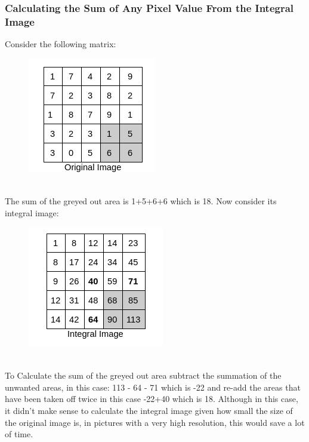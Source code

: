 \documentclass[12pt, letterpaper]{article}
\begin{document}
            \subsubsection{Calculating the Sum of Any Pixel Value From the Integral Image}
            Consider the following matrix:
            \begin{figure}[h]
                \includegraphics[scale=0.5]{photo1.png}
                \centering
            \end{figure}
            \\ The sum of the greyed out area is 1+5+6+6 which is 18. Now
            consider its integral image:
            \begin{figure}[h]
                \includegraphics[scale=0.5]{photo2.png}
                \centering
            \end{figure}
            \\ To Calculate the sum of the greyed out area subtract the
            summation of the unwanted areas, in this case: 113 - 64 -
            71 which is  -22 and re-add the areas that have been taken
            off twice in this case -22+40 which is 18. Although in
            this case, it didn’t make sense to calculate the integral
            image given how small the size of the original image is,
            in pictures with a very high resolution, this would save
            a lot of time. 
    
\end{document}
